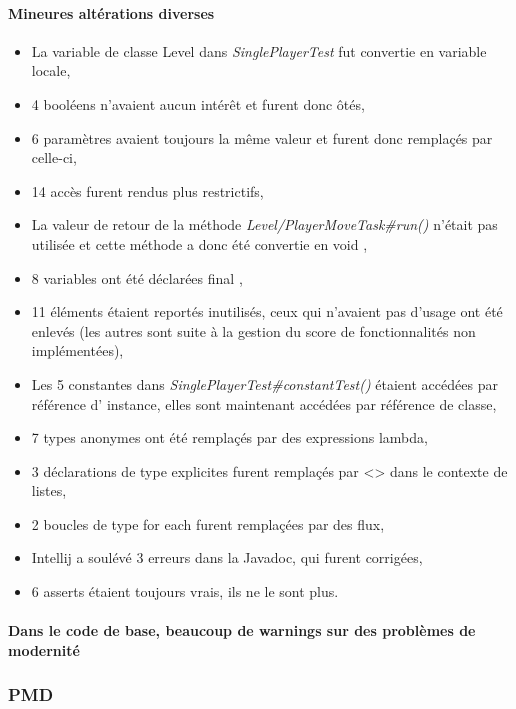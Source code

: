 \documentclass[12pt, openany]{report}
\begin{document}
\paragraph{Mineures altérations diverses}
\begin{itemize}
	\item La variable de classe \og Level \fg{} dans \mbox{\textit{SinglePlayerTest}} fut convertie en variable locale,
	\item 4 booléens n'avaient aucun intérêt et furent donc ôtés,
	\item 6 paramètres avaient toujours la même valeur et furent donc remplaçés par celle-ci,
	\item 14 accès furent rendus plus restrictifs,
	\item La valeur de retour de la méthode \mbox{\textit{Level/PlayerMoveTask\#run()}} n'était pas utilisée et cette méthode a donc été convertie en \og void \fg{},
	\item 8 variables ont été déclarées \og final \fg{},
	\item 11 éléments étaient reportés inutilisés, ceux qui n'avaient pas d'usage ont été enlevés (les autres sont suite à la gestion du score de fonctionnalités non implémentées),
	\item Les 5 constantes dans \mbox{\textit{SinglePlayerTest#constantTest()}} étaient accédées par référence d' instance, elles sont maintenant accédées par référence de classe, 
	\item 7 types anonymes ont été remplaçés par des expressions lambda,
	\item 3 déclarations de type explicites furent remplaçés par \og <> \fg{} dans le contexte de listes,
	\item 2 boucles de type \og for each \fg{} furent remplaçées par des flux,
	\item Intellij a soulévé 3 erreurs dans la Javadoc, qui furent corrigées,
	\item 6 \og asserts \fg{} étaient toujours vrais, ils ne le sont plus.
\end{itemize}
\paragraph{Dans le code de base, beaucoup de \og warnings \fg sur des \og problèmes de modernité \fg}


\subsubsection{PMD}
\end{document}
